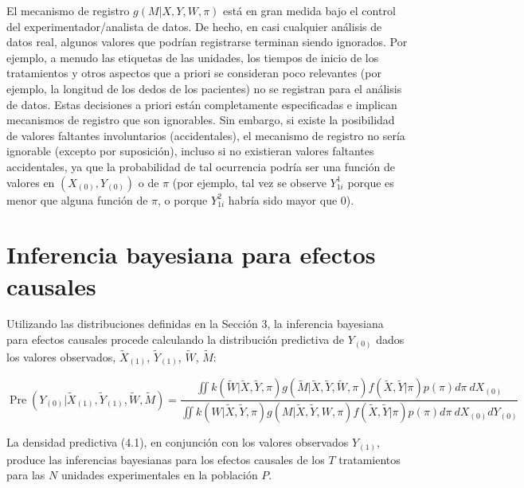 \documentclass[12pt,a4paper]{article}
\begin{document}
El mecanismo de registro $g(M|X,Y,W,\pi)$ está en gran medida bajo el control del experimentador/analista de datos. De hecho, en casi cualquier análisis de datos real, algunos valores que podrían registrarse terminan siendo ignorados. Por ejemplo, a menudo las etiquetas de las unidades, los tiempos de inicio de los tratamientos y otros aspectos que a priori se consideran poco relevantes (por ejemplo, la longitud de los dedos de los pacientes) no se registran para el análisis de datos. Estas decisiones a priori están completamente especificadas e implican mecanismos de registro que son ignorables. Sin embargo, si existe la posibilidad de valores faltantes involuntarios (accidentales), el mecanismo de registro no sería ignorable (excepto por suposición), incluso si no existieran valores faltantes accidentales, ya que la probabilidad de tal ocurrencia podría ser una función de valores en $(X_{(0)},Y_{(0)})$ o de $\pi$ (por ejemplo, tal vez se observe $Y_{1i}^1$ porque es menor que alguna función de $\pi$, o porque $Y_{1i}^2$ habría sido mayor que 0).

\section{Inferencia bayesiana para efectos causales}

Utilizando las distribuciones definidas en la Sección 3, la inferencia bayesiana para efectos causales procede calculando la distribución predictiva de $Y_{(0)}$ dados los valores observados, $\tilde{X}_{(1)}$, $\tilde{Y}_{(1)}$, $\tilde{W}$, $\tilde{M}$: %

\begin{equation}\label{eq:4.1}
\operatorname{Pre}(Y_{(0)}|\tilde{X}_{(1)},\tilde{Y}_{(1)},\tilde{W},\tilde{M}) = \frac{\iint k(\tilde{W}|\tilde{X},\tilde{Y},\pi)g(\tilde{M}|\tilde{X},\tilde{Y},\tilde{W},\pi)f(\tilde{X},\tilde{Y}|\pi)p(\pi)d\pi~dX_{(0)}}{\iint k(W|\tilde{X},\tilde{Y},\pi)g(M|\tilde{X},\tilde{Y},W,\pi)f(\tilde{X},\tilde{Y}|\pi)p(\pi)d\pi~dX_{(0)}dY_{(0)}} \tag{4.1}
\end{equation} %

La densidad predictiva (4.1), en conjunción con los valores observados $Y_{(1)}$, produce las inferencias bayesianas para los efectos causales de los $T$ tratamientos para las $N$ unidades experimentales en la población $P$. %
\end{document}
